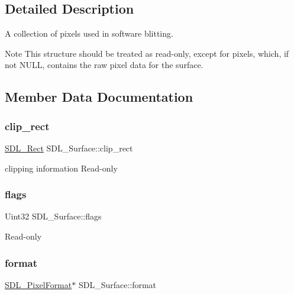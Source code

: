 \subsection{Detailed Description}
A collection of pixels used in software blitting. 

\begin{DoxyNote}{Note}
This structure should be treated as read-\/only, except for {\ttfamily pixels}, which, if not N\+U\+LL, contains the raw pixel data for the surface. 
\end{DoxyNote}


\subsection{Member Data Documentation}
\mbox{\label{struct_s_d_l___surface_aa9a0da3b38261dad6cf0cc4e3bb5b0c3}} 
\subsubsection{\texorpdfstring{clip\_rect}{clip\_rect}}
{\footnotesize\ttfamily \mbox{\hyperlink{struct_s_d_l___rect}{S\+D\+L\+\_\+\+Rect}} S\+D\+L\+\_\+\+Surface\+::clip\+\_\+rect}

clipping information Read-\/only \mbox{\label{struct_s_d_l___surface_a86d78b665d5dfd7aa1dd9696b067641b}} 
\subsubsection{\texorpdfstring{flags}{flags}}
{\footnotesize\ttfamily Uint32 S\+D\+L\+\_\+\+Surface\+::flags}

Read-\/only \mbox{\label{struct_s_d_l___surface_a0a90721f947c10c3b79e02ccb419ca62}} 
\subsubsection{\texorpdfstring{format}{format}}
{\footnotesize\ttfamily \mbox{\hyperlink{struct_s_d_l___pixel_format}{S\+D\+L\+\_\+\+Pixel\+Format}}$\ast$ S\+D\+L\+\_\+\+Surface\+::format}

